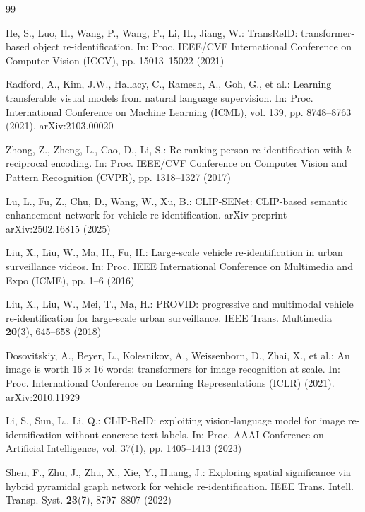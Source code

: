 \documentclass[10pt,a4paper]{article}
\begin{document}
\begin{thebibliography}{99}
\small

He, S., Luo, H., Wang, P., Wang, F., Li, H., Jiang, W.: TransReID:
transformer-based object re-identification. In: Proc. IEEE/CVF International
Conference on Computer Vision (ICCV), pp. 15013--15022 (2021)

Radford, A., Kim, J.W., Hallacy, C., Ramesh, A., Goh, G., et al.: Learning
transferable visual models from natural language supervision. In: Proc.
International Conference on Machine Learning (ICML), vol. 139, pp. 8748--8763
(2021). arXiv:2103.00020

Zhong, Z., Zheng, L., Cao, D., Li, S.: Re-ranking person re-identification with
$k$-reciprocal encoding. In: Proc. IEEE/CVF Conference on Computer Vision and
Pattern Recognition (CVPR), pp. 1318--1327 (2017)

Lu, L., Fu, Z., Chu, D., Wang, W., Xu, B.: CLIP-SENet: CLIP-based semantic
enhancement network for vehicle re-identification. arXiv preprint
arXiv:2502.16815 (2025)

Liu, X., Liu, W., Ma, H., Fu, H.: Large-scale vehicle re-identification in
urban surveillance videos. In: Proc. IEEE International Conference on
Multimedia and Expo (ICME), pp. 1--6 (2016)

Liu, X., Liu, W., Mei, T., Ma, H.: PROVID: progressive and multimodal vehicle
re-identification for large-scale urban surveillance. IEEE Trans. Multimedia
\textbf{20}(3), 645--658 (2018)

Dosovitskiy, A., Beyer, L., Kolesnikov, A., Weissenborn, D., Zhai, X., et al.:
An image is worth $16\times16$ words: transformers for image recognition at
scale. In: Proc. International Conference on Learning Representations (ICLR)
(2021). arXiv:2010.11929

Li, S., Sun, L., Li, Q.: CLIP-ReID: exploiting vision-language model for image
re-identification without concrete text labels. In: Proc. AAAI Conference on
Artificial Intelligence, vol. 37(1), pp. 1405--1413 (2023)

Shen, F., Zhu, J., Zhu, X., Xie, Y., Huang, J.: Exploring spatial significance
via hybrid pyramidal graph network for vehicle re-identification. IEEE Trans.
Intell. Transp. Syst. \textbf{23}(7), 8797--8807 (2022)


\end{thebibliography}
\end{document}
